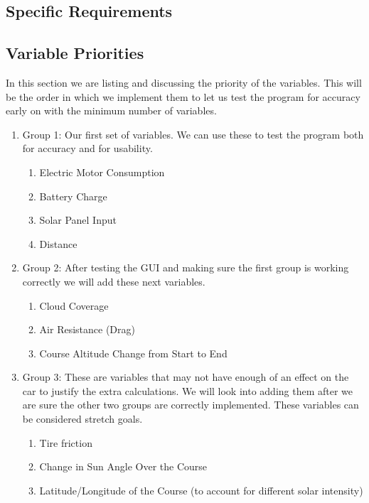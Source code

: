 \documentclass[onecolumn, draftclsnofoot,10pt, compsoc]{IEEEtran}
\begin{document}
\begin{singlespace}
\section{Specific Requirements}

    \subsection{Variable Priorities}
    In this section we are listing and discussing the priority of the variables. This will be the order in which we implement them to let us test the program for accuracy early on with the minimum number of variables.
    \begin{enumerate}
        \item Group 1: Our first set of variables. We can use these to test the program both for accuracy and for usability.
        \begin{enumerate}
            \item Electric Motor Consumption
            \item Battery Charge
            \item Solar Panel Input
            \item Distance
        \end{enumerate}
        \item Group 2: After testing the GUI and making sure the first group is working correctly we will add these next variables.
        \begin{enumerate}
            \item Cloud Coverage
            \item Air Resistance (Drag)
            \item Course Altitude Change from Start to End
        \end{enumerate}
        \item Group 3: These are variables that may not have enough of an effect on the car to justify the extra calculations. We will look into adding them after we are sure the other two groups are correctly implemented. These variables can be considered stretch goals.
        \begin{enumerate}
            \item Tire friction
            \item Change in Sun Angle Over the Course
            \item Latitude/Longitude of the Course (to account for different solar intensity)
        \end{enumerate}
    \end{enumerate}
    

\end{singlespace}
\end{document}

